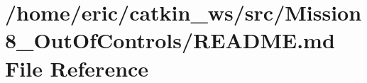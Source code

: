\hypertarget{Mission8__OutOfControls_2README_8md}{}\section{/home/eric/catkin\+\_\+ws/src/\+Mission8\+\_\+\+Out\+Of\+Controls/\+R\+E\+A\+D\+ME.md File Reference}
\label{Mission8__OutOfControls_2README_8md}
